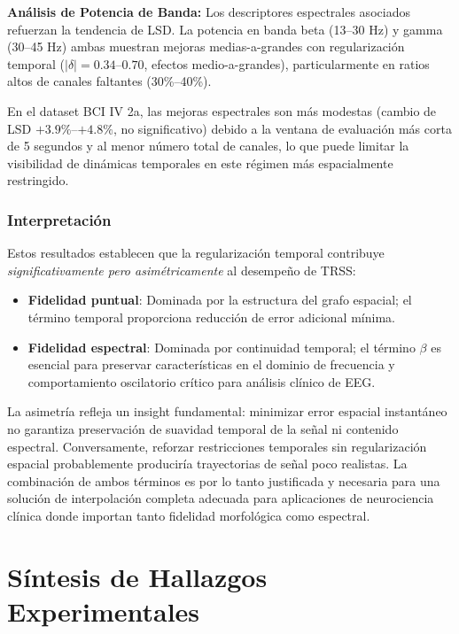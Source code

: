 \textbf{Análisis de Potencia de Banda:} Los descriptores espectrales asociados refuerzan la tendencia de LSD. La potencia en banda beta (13--30 Hz) y gamma (30--45 Hz) ambas muestran mejoras medias-a-grandes con regularización temporal ($|\delta| = 0.34$--$0.70$, efectos medio-a-grandes), particularmente en ratios altos de canales faltantes (30\%--40\%).

En el dataset BCI IV 2a, las mejoras espectrales son más modestas (cambio de LSD $+3.9\%$--$+4.8\%$, no significativo) debido a la ventana de evaluación más corta de 5 segundos y al menor número total de canales, lo que puede limitar la visibilidad de dinámicas temporales en este régimen más espacialmente restringido.

\subsubsection{Interpretación}

Estos resultados establecen que la regularización temporal contribuye \textit{significativamente pero asimétricamente} al desempeño de TRSS:

\begin{itemize}
  \item \textbf{Fidelidad puntual}: Dominada por la estructura del grafo espacial; el término temporal proporciona reducción de error adicional mínima.
  \item \textbf{Fidelidad espectral}: Dominada por continuidad temporal; el término $\beta$ es esencial para preservar características en el dominio de frecuencia y comportamiento oscilatorio crítico para análisis clínico de EEG.
\end{itemize}

La asimetría refleja un insight fundamental: minimizar error espacial instantáneo no garantiza preservación de suavidad temporal de la señal ni contenido espectral. Conversamente, reforzar restricciones temporales sin regularización espacial probablemente produciría trayectorias de señal poco realistas. La combinación de ambos términos es por lo tanto justificada y necesaria para una solución de interpolación completa adecuada para aplicaciones de neurociencia clínica donde importan tanto fidelidad morfológica como espectral.

\section{Síntesis de Hallazgos Experimentales}

